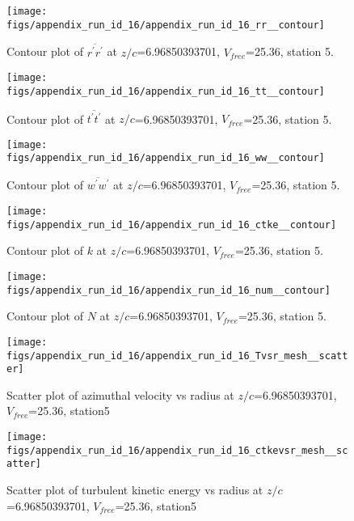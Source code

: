 \begin{figure}[H]
\centering
\texttt{[image: figs/appendix\_run\_id\_16/appendix\_run\_id\_16\_rr\_\_contour]}
\caption{Contour plot of $\overline{r^\prime r^\prime}$ at $z/c$=6.96850393701, $V_{free}$=25.36, station 5.}
\label{fig:appendix_run_id_16_rr__contour}
\end{figure}


\begin{figure}[H]
\centering
\texttt{[image: figs/appendix\_run\_id\_16/appendix\_run\_id\_16\_tt\_\_contour]}
\caption{Contour plot of $\overline{t^\prime t^\prime}$ at $z/c$=6.96850393701, $V_{free}$=25.36, station 5.}
\label{fig:appendix_run_id_16_tt__contour}
\end{figure}


\begin{figure}[H]
\centering
\texttt{[image: figs/appendix\_run\_id\_16/appendix\_run\_id\_16\_ww\_\_contour]}
\caption{Contour plot of $\overline{w^\prime w^\prime}$ at $z/c$=6.96850393701, $V_{free}$=25.36, station 5.}
\label{fig:appendix_run_id_16_ww__contour}
\end{figure}


\begin{figure}[H]
\centering
\texttt{[image: figs/appendix\_run\_id\_16/appendix\_run\_id\_16\_ctke\_\_contour]}
\caption{Contour plot of $k$ at $z/c$=6.96850393701, $V_{free}$=25.36, station 5.}
\label{fig:appendix_run_id_16_ctke__contour}
\end{figure}


\begin{figure}[H]
\centering
\texttt{[image: figs/appendix\_run\_id\_16/appendix\_run\_id\_16\_num\_\_contour]}
\caption{Contour plot of $N$ at $z/c$=6.96850393701, $V_{free}$=25.36, station 5.}
\label{fig:appendix_run_id_16_num__contour}
\end{figure}


\begin{figure}[H]
\centering
\texttt{[image: figs/appendix\_run\_id\_16/appendix\_run\_id\_16\_Tvsr\_mesh\_\_scatter]}
\caption{Scatter plot of azimuthal velocity vs radius at $z/c$=6.96850393701, $V_{free}$=25.36, station5}
\label{fig:appendix_run_id_16_Tvsr_mesh__scatter}
\end{figure}


\begin{figure}[H]
\centering
\texttt{[image: figs/appendix\_run\_id\_16/appendix\_run\_id\_16\_ctkevsr\_mesh\_\_scatter]}
\caption{Scatter plot of turbulent kinetic energy vs radius at $z/c$=6.96850393701, $V_{free}$=25.36, station5}
\label{fig:appendix_run_id_16_ctkevsr_mesh__scatter}
\end{figure}


